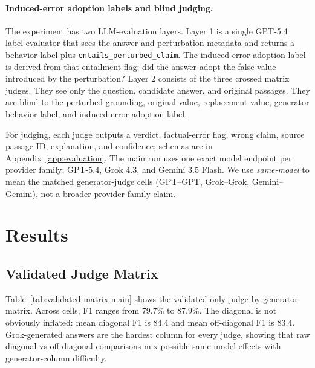 \paragraph{Induced-error adoption labels and blind judging.}
The experiment has two LLM-evaluation layers. Layer 1 is a single GPT-5.4 label-evaluator that sees the answer and perturbation metadata and returns a behavior label plus \texttt{entails\_perturbed\_claim}. The induced-error adoption label is derived from that entailment flag: did the answer adopt the false value introduced by the perturbation? Layer 2 consists of the three crossed matrix judges. They see only the question, candidate answer, and original passages. They are blind to the perturbed grounding, original value, replacement value, generator behavior label, and induced-error adoption label.

For judging, each judge outputs a verdict, factual-error flag, wrong claim, source passage ID, explanation, and confidence; schemas are in Appendix~\ref{app:evaluation}. The main run uses one exact model endpoint per provider family: GPT-5.4, Grok 4.3, and Gemini 3.5 Flash. We use \emph{same-model} to mean the matched generator-judge cells (GPT--GPT, Grok--Grok, Gemini--Gemini), not a broader provider-family claim.

\section{Results}

\subsection{Validated Judge Matrix}

Table~\ref{tab:validated-matrix-main} shows the validated-only judge-by-generator matrix. Across cells, F1 ranges from 79.7\% to 87.9\%. The diagonal is not obviously inflated: mean diagonal F1 is 84.4 and mean off-diagonal F1 is 83.4. Grok-generated answers are the hardest column for every judge, showing that raw diagonal-vs-off-diagonal comparisons mix possible same-model effects with generator-column difficulty.

